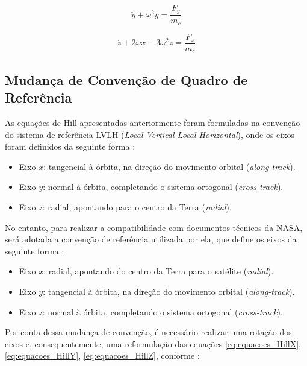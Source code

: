 \begin{equation}
    \label{eq:equacoes_HillY}
\ddot{y} + \omega^2 y = \frac{F_y}{m_c}
\end{equation}

\begin{equation}
    \label{eq:equacoes_HillZ}
\ddot{z} + 2\omega \dot{x} - 3 \omega^2 z = \frac{F_z}{m_c}
\end{equation}



\subsection{Mudança de Convenção de Quadro de Referência}

As equações de Hill apresentadas anteriormente foram formuladas na convenção do sistema de referência LVLH (\emph{Local Vertical Local Horizontal}), onde os eixos foram definidos da seguinte forma \cite{fehse2003}:

\begin{itemize}
    \item Eixo $x$: tangencial à órbita, na direção do movimento orbital (\emph{along-track}).
    \item Eixo $y$: normal à órbita, completando o sistema ortogonal  (\emph{cross-track}).
    \item Eixo $z$: radial, apontando para o centro da Terra  (\emph{radial}).
\end{itemize}

No entanto, para realizar a compatibilidade com documentos técnicos da NASA, será adotada a convenção de referência utilizada por ela, que define os eixos da seguinte forma \cite{Folta2022}:

\begin{itemize}
    \item Eixo $x$: radial, apontando do centro da Terra para o satélite (\emph{radial}).
    \item Eixo $y$: tangencial à órbita, na direção do movimento orbital  (\emph{along-track}).
    \item Eixo $z$: normal à órbita, completando o sistema ortogonal  (\emph{cross-track}).
\end{itemize}

Por conta dessa mudança de convenção, é necessário realizar uma rotação dos eixos e, consequentemente, uma reformulação das equações \eqref{eq:equacoes_HillX}, \eqref{eq:equacoes_HillY}, \eqref{eq:equacoes_HillZ}, conforme \cite{sidi1997spacecraft}:

